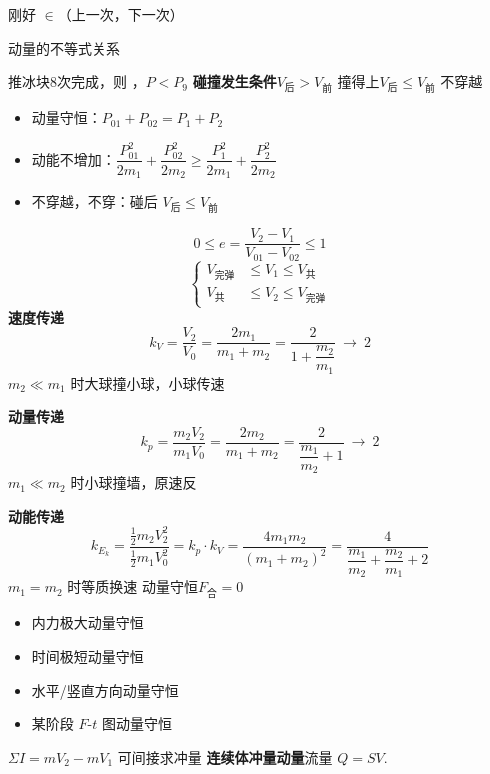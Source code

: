 刚好 $\in$（上一次，下一次）

动量的不等式关系

推冰块8次完成，则 ，$P<P_9$ %
\textbf{碰撞发生条件}\quad $V_{\text{后}}>V_{\text{前}}$ 撞得上\quad $V_{\text{后}}\le V_{\text{前}}$ 不穿越
\begin{itemize}
\item 动量守恒：$P_{01}+P_{02}=P_1+P_2$
\item 动能不增加：$\dfrac{P_{01}^2}{2m_1}+\dfrac{P_{02}^2}{2m_2}\ge\dfrac{P_1^2}{2m_1}+\dfrac{P_2^2}{2m_2}$ %
\item 不穿越，不穿：碰后 $V_{\text{后}}\le V_{\text{前}}$
\end{itemize}
\[
0\le e=\frac{V_2-V_1}{V_{01}-V_{02}}\le1
\]
\[
\left\{\begin{aligned}
V_{\text{完弹}}&\le V_1\le V_{\text{共}}\\
V_{\text{共}}&\le V_2\le V_{\text{完弹}}
\end{aligned}\right.
\]
\textbf{速度传递}
\[
k_V=\frac{V_2}{V_0}=\frac{2m_1}{m_1+m_2}=\frac{2}{1+\dfrac{m_2}{m_1}}\ \to\ 2
\]
$m_2\ll m_1$ 时大球撞小球，小球传速\, %

\textbf{动量传递}
\[
k_p=\frac{m_2V_2}{m_1V_0}=\frac{2m_2}{m_1+m_2}=\frac{2}{\dfrac{m_1}{m_2}+1}\ \to\ 2
\]
$m_1\ll m_2$ 时小球撞墙，原速\red{$\times$}反 %

\textbf{动能传递}
\[
k_{E_k}=\frac{\frac12m_2V_2^2}{\frac12m_1V_0^2}=k_p\cdot k_V=\frac{4m_1m_2}{(m_1+m_2)^2}=\frac{4}{\dfrac{m_1}{m_2}+\dfrac{m_2}{m_1}+2}
\]
$m_1=m_2$ 时等质换速
动量守恒\quad $F_{\text{合}}=0$
\begin{itemize}
\item 内力极大动量守恒
\item 时间极短动量守恒
\item 水平/竖直方向动量守恒
\item 某阶段 $F$-$t$ 图动量守恒
\end{itemize}
$\Sigma I=mV_2-mV_1$ 可间接求冲量
\textbf{连续体冲量动量}\quad 流量 $Q=SV$.

